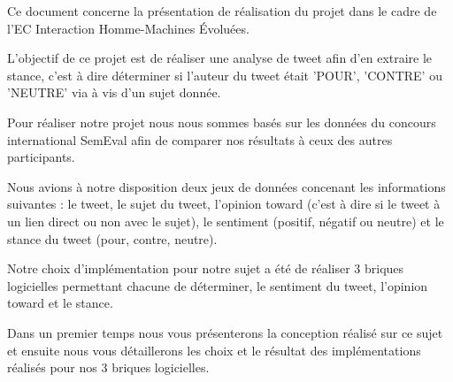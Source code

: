 	\par Ce document concerne la présentation de réalisation du projet dans le cadre de l'EC Interaction Homme-Machines Évoluées.  
	\par L'objectif de ce projet est de réaliser une analyse de tweet afin d'en extraire le stance, c'est à dire déterminer si l'auteur du tweet était 'POUR', 'CONTRE' ou 'NEUTRE' via à vis d'un sujet donnée.\\ 
	
	\par Pour réaliser notre projet nous nous sommes basés sur les données du concours international SemEval afin de comparer nos résultats à ceux des autres participants.
	\par Nous avions à notre disposition deux jeux de données concenant les informations suivantes : le tweet, le sujet du tweet, l'opinion toward (c'est à dire si le tweet à un lien direct ou non avec le sujet), le sentiment (positif, négatif ou neutre) et le stance du tweet (pour, contre, neutre). 
	
	\par Notre choix d'implémentation pour notre sujet a été de réaliser 3 briques logicielles permettant chacune de déterminer, le sentiment du tweet, l'opinion toward et le stance. \\
	
	\par Dans un premier temps nous vous présenterons la conception réalisé sur ce sujet et ensuite nous vous détaillerons les choix et le résultat des implémentations réalisés pour nos 3 briques logicielles.
